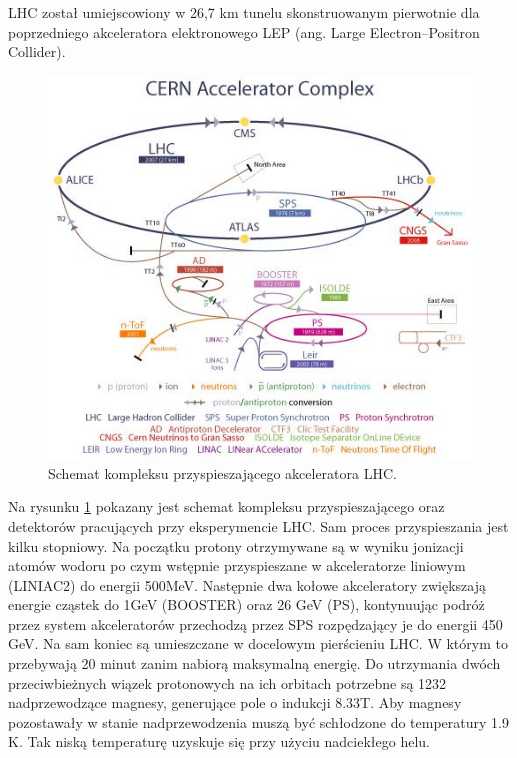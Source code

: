 LHC został umiejscowiony w 26,7 km tunelu skonstruowanym pierwotnie dla poprzedniego akceleratora elektronowego LEP (ang. Large Electron–Positron Collider). 
\begin{figure}[h]
  \centering
  \includegraphics[scale=1.1]{rozdzial2/AccComple.jpeg}
  \caption{Schemat kompleksu przyspieszającego akceleratora LHC. \cite{public}}
  \label{fig:AccComplex}
\end{figure}

Na rysunku \ref{fig:AccComplex} pokazany jest schemat kompleksu przyspieszającego oraz detektorów pracujących przy eksperymencie LHC. Sam proces przyspieszania jest kilku stopniowy\cite{Haefeli}.
Na początku protony otrzymywane są w wyniku jonizacji atomów wodoru po czym wstępnie przyspieszane w akceleratorze liniowym (LINIAC2) do energii 500MeV. Następnie dwa kołowe akceleratory zwiększają energie cząstek do 1GeV (BOOSTER) oraz 26 GeV (PS), kontynuując podróż przez system akceleratorów  przechodzą przez SPS rozpędzający je do energii 450 GeV. Na sam koniec są umieszczane w docelowym pierścieniu LHC. W którym to przebywają 20 minut zanim nabiorą maksymalną energię. Do utrzymania dwóch przeciwbieżnych wiązek protonowych na ich orbitach potrzebne są 1232 nadprzewodzące magnesy, generujące pole o indukcji 8.33T. Aby magnesy pozostawały w stanie nadprzewodzenia muszą być schłodzone do temperatury 1.9 K. Tak niską temperaturę uzyskuje się przy użyciu nadciekłego helu. 

